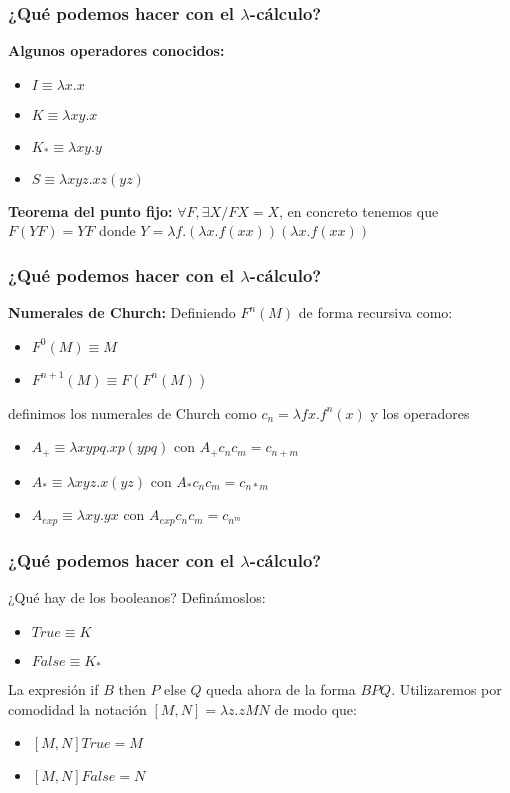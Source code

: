 \documentclass[spanish, a4paper, 12pt, final, slideColor, nototal, colorBG, pdf, noaccumulate, darkblue] {beamer}
\begin{document}
\begin{frame}
    \frametitle{¿Qué podemos hacer con el $\lambda$-cálculo?}
    \textbf{Algunos operadores conocidos:}
    \begin{itemize}
        \item $I \equiv \lambda x.x$
        \item $K \equiv \lambda xy.x$
        \item $K_* \equiv \lambda xy.y$
        \item $S \equiv \lambda xyz.xz(yz)$
    \end{itemize}
    \textbf{Teorema del punto fijo: }$\forall F, \exists X / FX = X$, en concreto tenemos que $F(YF) = YF$ donde $Y = \lambda f.(\lambda x.f(xx))(\lambda x.f(xx))$
\end{frame}
\begin{frame}
    \frametitle{¿Qué podemos hacer con el $\lambda$-cálculo?}
    \textbf{Numerales de Church:}
    Definiendo $F^n(M)$ de forma recursiva como:
    \begin{itemize}
        \item $F^0(M) \equiv M$
        \item $F^{n+1}(M) \equiv F(F^n(M))$
    \end{itemize}
    definimos los numerales de Church como $c_n = \lambda fx.f^n(x)$ y los operadores
    \begin{itemize}
        \item $A_+ \equiv \lambda xypq.xp(ypq)$ con $A_+ c_n c_m = c_{n+m}$
        \item $A_* \equiv \lambda xyz.x(yz)$ con $A_* c_n c_m = c_{n*m}$
        \item $A_{exp} \equiv \lambda xy.yx$ con $A_{exp} c_n c_m = c_{n^m}$
    \end{itemize}
\end{frame}
\begin{frame}
    \frametitle{¿Qué podemos hacer con el $\lambda$-cálculo?}
    ¿Qué hay de los booleanos? Definámoslos:
    \begin{itemize}
        \item $True \equiv K$
        \item $False \equiv K_*$
    \end{itemize}
    La expresión if $B$ then $P$ else $Q$ queda ahora de la forma $BPQ$.
    Utilizaremos por comodidad la notación $[M,N] = \lambda z.zMN$ de modo que:
    \begin{itemize}
        \item $[M,N]True = M$
        \item $[M,N]False = N$
    \end{itemize}
\end{frame}
\end{document}
